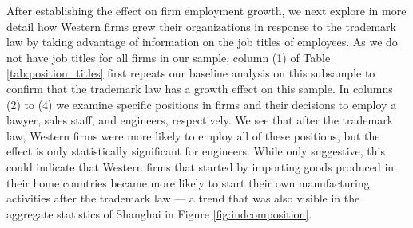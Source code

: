\documentclass[12pt]{article}
\begin{document}


After establishing the effect on firm employment growth, we next explore in more detail how Western firms grew their organizations in response to the trademark law by taking advantage of information on the job titles of employees. As we do not have job titles for all firms in our sample, column (1) of Table \ref{tab:position_titles} first repeats our baseline analysis on this subsample to confirm that the trademark law has a growth effect on this sample. In columns (2) to (4) we examine specific positions in firms and their decisions to employ a lawyer, sales staff, and engineers, respectively. We see that after the trademark law, Western firms were more likely to employ all of these positions, but the effect is only statistically significant for engineers. While only suggestive, this could indicate that Western firms that started by importing goods produced in their home countries became more likely to start their own manufacturing activities after the trademark law --- a trend that was also visible in the aggregate statistics of Shanghai in Figure \ref{fig:indcomposition}. 
\end{document}
